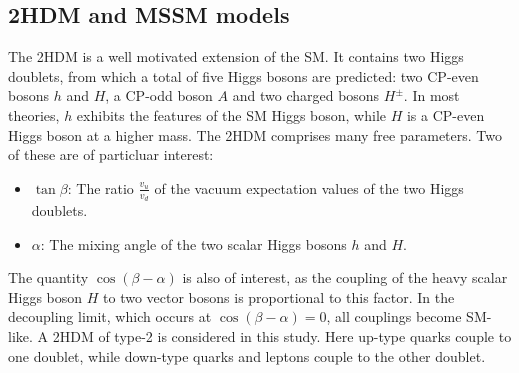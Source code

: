 \subsection*{2HDM and MSSM models}
The 2HDM is a well motivated extension of the SM. It contains two Higgs doublets, from which a total of five Higgs bosons are predicted: 
two CP-even bosons $h$ and $H$, a CP-odd boson $A$ and two charged bosons $H^\pm$. In most theories, $h$ exhibits the features of the SM Higgs boson, while $H$ is a CP-even Higgs boson at a higher mass. The 2HDM comprises many free parameters. Two of these are of particluar interest:
\begin{itemize}
\item $\tan\beta$: The ratio $\frac{v_u}{v_d}$ of the vacuum expectation values of the two Higgs doublets.
\item $\alpha$: The mixing angle of the two scalar Higgs bosons $h$ and $H$.
\end{itemize}
The quantity $\cos(\beta-\alpha)$ is also of interest, as the coupling of the heavy scalar Higgs boson $H$ to two vector bosons is proportional to this factor. In the decoupling limit, which occurs at $\cos(\beta-\alpha)=0$, all couplings become SM-like.
A 2HDM of type-2 is considered in this study. Here up-type quarks couple to one doublet, while down-type quarks and leptons couple to the other doublet.\\ 
\newline
